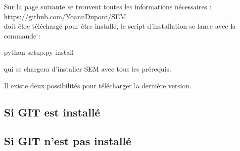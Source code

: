 \documentclass[manual-fr.tex]{subfiles}
\begin{document}
Sur la page suivante se trouvent toutes les informations nécessaires :\\

https://github.com/YoannDupont/SEM \\

\SEM doit être téléchargé pour être installé, le script d'installation se lance avec la commande :

python setup.py install

qui se chargera d'installer SEM avec tous les prérequis.

Il existe deux possibilités pour télécharger la dernière version.

\subsection{Si GIT est installé}


\subsection{Si GIT n'est pas installé}


\subsection{\Wapiti}

\end{document}
